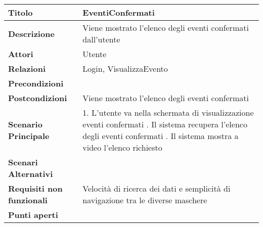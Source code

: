 \begin{tabular} {|P{4.5cm}|P{12.5cm}|}
  \hline
  \textbf{Titolo}                   & EventiConfermati                                            \\
  \hline
  \textbf{Descrizione}              & Viene mostrato l'elenco degli eventi confermati dall'utente \\
  \hline
  \textbf{Attori}                   & Utente                                                      \\
  \hline
  \textbf{Relazioni}                & Login, VisualizzaEvento                                     \\
  \hline
  \textbf{Precondizioni}            &                                                             \\
  \hline
  \textbf{Postcondizioni}           & Viene mostrato l'elenco degli eventi confermati             \\
  \hline
  \textbf{Scenario Principale}      & 1. L'utente va nella schermata di
  visualizzazione eventi confermati . Il sistema recupera l'elenco degli eventi confermati . Il sistema mostra a video
  l'elenco richiesto                                                                              \\
  \hline
  \textbf{Scenari Alternativi}      &                                                             \\
  \hline
  \textbf{Requisiti non funzionali} & Velocità di ricerca dei dati e
  semplicità di navigazione tra le diverse maschere                                               \\
  \hline
  \textbf{Punti aperti}             &                                                             \\
  \hline
\end{tabular}
\hfill
\break

